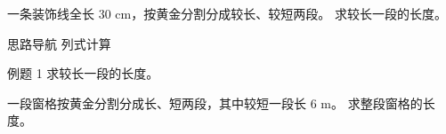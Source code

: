 \documentclass{exam-zh}
\begin{document}

\begin{eduProblemBlock}[例题 1]
一条装饰线全长 $30\text{ cm}$，按黄金分割分成较长、较短两段。
求较长一段的长度。

\end{eduProblemBlock}





\begin{eduAuxItem}{思路导航}
列式计算\end{eduAuxItem}




\begin{eduSubQuestionItem}{例题 1}
求较长一段的长度。\end{eduSubQuestionItem}

\begin{eduDualExplain}
  \begin{eduExplainLeft}
  \end{eduExplainLeft}

  \begin{eduExplainRight}
  \end{eduExplainRight}
\end{eduDualExplain}



\clearpage
{}

\begin{eduProblemBlock}[例题 2]
一段窗格按黄金分割分成长、短两段，其中较短一段长 $6\text{ m}$。
求整段窗格的长度。

\end{eduProblemBlock}
\end{document}
